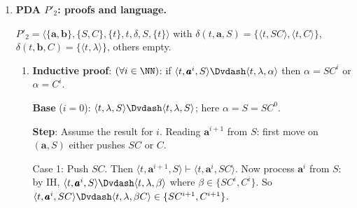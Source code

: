 \begin{enumerate}[{10.}1. ]
Because the acceptance condition is $\Lambda(P'_1)$, the machine must accept via
\emph{empty stack}, not via final state. A one-state DPDA with the required
language is
\[
P'_1=\langle\{\pmb{a},\pmb{b}\},\{Z,S,A\},\{t\},t,\delta,Z,\emptyset\rangle,
\]
where the only nonempty transitions are
\begin{align*}
\delta(t,\pmb{a},Z)&=\langle t,S\rangle, \\
\delta(t,\pmb{a},S)&=\langle t,SA\rangle, \\
\delta(t,\pmb{b},S)&=\langle t,\lambda\rangle, \\
\delta(t,\pmb{b},A)&=\langle t,\lambda\rangle.
\end{align*}
After reading $\pmb{a}^n$ ($n\geq 1$), the stack is $SA^{n-1}$: the symbol $S$
marks the transition from the $\pmb{a}$-phase to the $\pmb{b}$-phase, and the
$A$'s remember the remaining $n-1$ copies. The first $\pmb{b}$ removes $S$, and
the remaining $\pmb{b}$'s remove the $A$'s one by one. Thus
\[
\langle t,\pmb{a}^n\pmb{b}^n,Z\rangle\Dvdash\langle t,\lambda,\lambda\rangle
\qquad(n\geq 1).
\]
No other words can empty the stack: $\lambda$ leaves the initial symbol $Z$ in
place, a word beginning with $\pmb{b}$ has no move, and once the machine has
started reading $\pmb{b}$'s it can no longer read an $\pmb{a}$. Hence
$\Lambda(P'_1)=\{\pmb{a}^n\pmb{b}^n \mid n\geq 1\}$.

\item \textbf{PDA $P'_2$: proofs and language.}

$P'_2 = \langle\{\pmb{a},\pmb{b}\},\{S,C\},\{t\},t,\delta,S,\{t\}\rangle$ with $\delta(t,\pmb{a},S) = \{\langle t,SC\rangle,\langle t,C\rangle\}$, $\delta(t,\pmb{b},C) = \{\langle t,\lambda\rangle\}$, others empty.

\begin{enumerate}
\item \textbf{Inductive proof}: $(\forall i\in\NN)$: if $\langle t,\pmb{a}^i,S\rangle\Dvdash\langle t,\lambda,\alpha\rangle$ then $\alpha = SC^i$ or $\alpha = C^i$.

\textbf{Base} ($i=0$): $\langle t,\lambda,S\rangle\Dvdash\langle t,\lambda,S\rangle$; here $\alpha=S=SC^0$. \checkmark

\textbf{Step}: Assume the result for $i$. Reading $\pmb{a}^{i+1}$ from $S$: first move on $(\pmb{a},S)$ either pushes $SC$ or $C$.

Case 1: Push $SC$. Then $\langle t,\pmb{a}^{i+1},S\rangle\vdash\langle t,\pmb{a}^i,SC\rangle$. Now process $\pmb{a}^i$ from $S$: by IH, $\langle t,\pmb{a}^i,S\rangle\Dvdash\langle t,\lambda,\beta\rangle$ where $\beta\in\{SC^i,C^i\}$. So $\langle t,\pmb{a}^i,SC\rangle\Dvdash\langle t,\lambda,\beta C\rangle\in\{SC^{i+1},C^{i+1}\}$.


\end{enumerate}
\end{enumerate}
